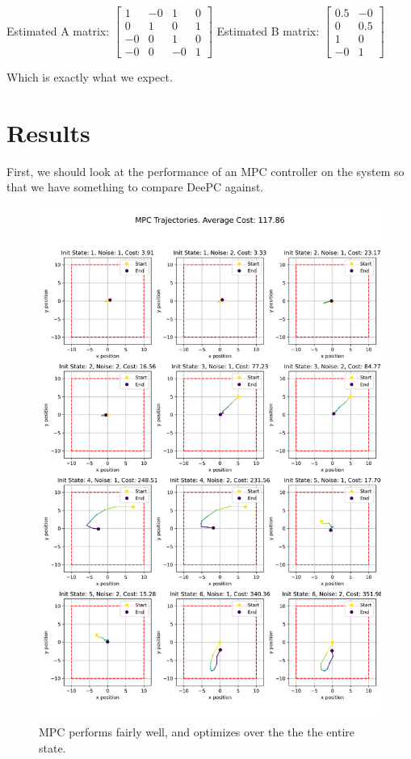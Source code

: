 \documentclass[11pt,a4paper]{article}
\begin{document}
Estimated A matrix:
$\begin{bmatrix}
    1 & -0 & 1 & 0 \\
    0 & 1 & 0 & 1 \\
    -0 & 0 & 1 & 0 \\
    -0 & 0 & -0 & 1
\end{bmatrix}$
Estimated B matrix:
$\begin{bmatrix}
    0.5 & -0 \\
    0 & 0.5 \\
    1 & 0 \\
    -0 & 1
\end{bmatrix}$

Which is exactly what we expect.

\section{Results}
First, we should look at the performance of an MPC controller on the system so that we have something to compare DeePC against.


\begin{figure}
    \centering
    \includegraphics[width=0.85\linewidth]{./figures/mpc_trajectories.png}
    \caption{MPC performs fairly well, and optimizes over the the the entire state.}
    \label{fig:enter-label}
\end{figure}
\end{document}

